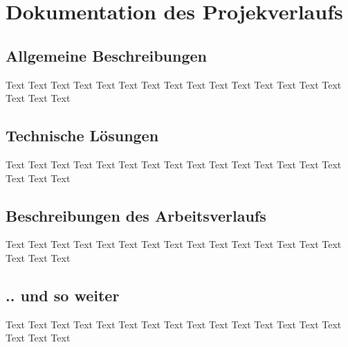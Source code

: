 \chapter{Dokumentation des Projekverlaufs}
\section{Allgemeine Beschreibungen}
Text Text Text Text Text Text Text Text Text Text Text Text Text Text Text Text Text Text
\section{Technische L\"osungen}
Text Text Text Text Text Text Text Text Text Text Text Text Text Text Text Text Text Text
\section{Beschreibungen des Arbeitsverlaufs}
Text Text Text Text Text Text Text Text Text Text Text Text Text Text Text Text Text Text
\section{.. und so weiter}
Text Text Text Text Text Text Text Text Text Text Text Text Text Text Text Text Text Text